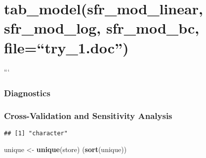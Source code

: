 \documentclass[]{article}
\newenvironment{Shaded}{\begin{snugshade}}{\end{snugshade}}
\newcommand{\DecValTok}[1]{\textcolor[rgb]{0.00,0.00,0.81}{#1}}
\newcommand{\KeywordTok}[1]{\textcolor[rgb]{0.13,0.29,0.53}{\textbf{#1}}}
\newcommand{\NormalTok}[1]{#1}
\newcommand{\OperatorTok}[1]{\textcolor[rgb]{0.81,0.36,0.00}{\textbf{#1}}}
\newcommand{\StringTok}[1]{\textcolor[rgb]{0.31,0.60,0.02}{#1}}
\begin{document}
\hypertarget{section-12}{%
\section{}\label{section-12}}

\hypertarget{tab_modelsfr_mod_linear-sfr_mod_log-sfr_mod_bc-filetry_1.doc}{%
\section{tab\_model(sfr\_mod\_linear, sfr\_mod\_log, sfr\_mod\_bc,
file=``try\_1.doc'')}\label{tab_modelsfr_mod_linear-sfr_mod_log-sfr_mod_bc-filetry_1.doc}}

```

\hypertarget{diagnostics}{%
\subsubsection{Diagnostics}\label{diagnostics}}

\hypertarget{cross-validation-and-sensitivity-analysis}{%
\subsubsection{Cross-Validation and Sensitivity
Analysis}\label{cross-validation-and-sensitivity-analysis}}

\begin{Shaded}
\end{Shaded}

\begin{verbatim}
## [1] "character"
\end{verbatim}

\begin{Shaded}
\begin{Highlighting}[]
\NormalTok{unique <-}\StringTok{ }\KeywordTok{unique}\NormalTok{(store)}
\NormalTok{(}\KeywordTok{sort}\NormalTok{(unique))}
\end{Highlighting}
\end{Shaded}
\end{document}
